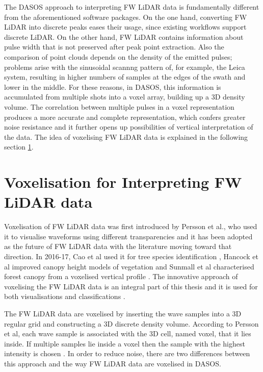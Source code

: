 \documentclass{subfiles}
\begin{document}
	\par The DASOS approach to interpreting FW LiDAR data is fundamentally different from the aforementioned software packages. On the one hand, converting FW LiDAR into discrete peaks eases their usage, since existing workflows support discrete LiDAR.  On the other hand, FW LiDAR contains information about pulse width that is not preserved after peak point extraction. Also the comparison of point clouds depends on the density of the emitted pulses; problems arise with the sinusoidal scannng pattern of, for example, the Leica system, resulting in higher numbers of samples at the edges of the swath and lower in the middle. For these reasons, in DASOS, this information is accumulated from multiple shots into a voxel array, building up a 3D density volume. The correlation between multiple pulses in a voxel representation produces a more accurate and complete representation, which confers greater noise resistance and it further opens up possibilities of vertical interpretation of the data. The idea of voxelising FW LiDAR data is explained in the following section \ref{Voxelisation}.  
	
		
	 \section{Voxelisation for Interpreting FW LiDAR data}\label{Voxelisation}
		
	\par Voxelisation of FW LiDAR data was first introduced by Persson et al., who used it to visualise waveforms using different transparencies \cite{Persson2005} and {\color {blue} it has been adopted as the future of FW LiDAR data with the literature moving toward that direction.} In 2016-17, Cao et al used it for tree species identification \cite{Cao2016}, Hancock et al improved canopy height models of vegetation \cite{Hancock2017}  and Sunmall et al characterised forest canopy from a voxelised vertical profile \cite{Sumnall2016}. {\color{blue}The innovative approach of voxelising the FW LiDAR data }is an integral part of this thesis and it is used for both visualisations and classifications \cite{Miltiadou2014}\cite{Miltiadou2015}. 

	\par The FW LiDAR data are voxelised by inserting the wave samples into a 3D regular grid and constructing a 3D discrete density volume. According to Persson et al, each wave sample is associated with the 3D cell, named voxel, that it lies inside. If multiple samples lie inside a voxel then the sample with the highest intensity is chosen \cite{Persson2005}. In order to reduce noise, there are two differences between this approach and the way FW LiDAR data are voxelised in DASOS. 
		
\end{document}
